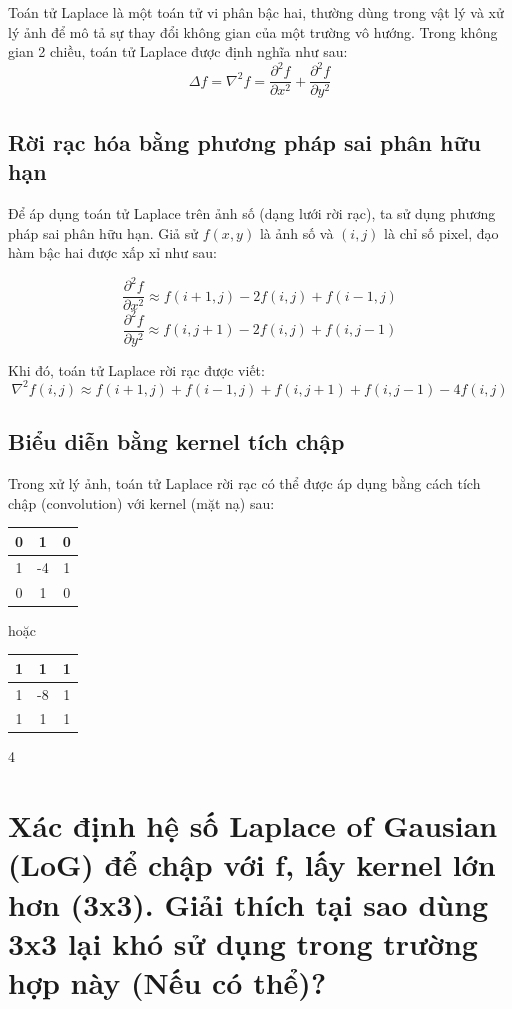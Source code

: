 \documentclass[12pt]{article}
\begin{document}
	Toán tử Laplace là một toán tử vi phân bậc hai, thường dùng trong vật lý và xử lý ảnh để mô tả sự thay đổi không gian của một trường vô hướng. Trong không gian 2 chiều, toán tử Laplace được định nghĩa như sau:
	\[
	\Delta f = \nabla^2 f = \frac{\partial^2 f}{\partial x^2} + \frac{\partial^2 f}{\partial y^2}
	\]
	
	\subsection{Rời rạc hóa bằng phương pháp sai phân hữu hạn}
	
	Để áp dụng toán tử Laplace trên ảnh số (dạng lưới rời rạc), ta sử dụng phương pháp sai phân hữu hạn. Giả sử $f(x,y)$ là ảnh số và $(i,j)$ là chỉ số pixel, đạo hàm bậc hai được xấp xỉ như sau:
	
	\[
	\frac{\partial^2 f}{\partial x^2} \approx f(i+1,j) - 2f(i,j) + f(i-1,j)
	\]
	\[
	\frac{\partial^2 f}{\partial y^2} \approx f(i,j+1) - 2f(i,j) + f(i,j-1)
	\]
	
	Khi đó, toán tử Laplace rời rạc được viết:
	\[
	\nabla^2 f(i,j) \approx f(i+1,j) + f(i-1,j) + f(i,j+1) + f(i,j-1) - 4f(i,j)
	\]
	
	\subsection{Biểu diễn bằng kernel tích chập}
	
	Trong xử lý ảnh, toán tử Laplace rời rạc có thể được áp dụng bằng cách tích chập (convolution) với kernel (mặt nạ) sau:
	
	\begin{center}
		\begin{tabular}{|c|c|c|}
			\hline
			0 & 1 & 0 \\
			\hline
			1 & -4 & 1 \\
			\hline
			0 & 1 & 0 \\
			\hline
		\end{tabular}
		\quad hoặc \quad
		\begin{tabular}{|c|c|c|}
			\hline
			1 & 1 & 1 \\
			\hline
			1 & -8 & 1 \\
			\hline
			1 & 1 & 1 \\
			\hline
		\end{tabular}
	\end{center}
		4
	\section{Xác định hệ số Laplace of Gausian (LoG) để chập với f, lấy kernel lớn hơn (3x3). Giải thích tại sao dùng 3x3 lại khó sử dụng trong trường hợp này (Nếu có thể)?  }
	
\end{document}
